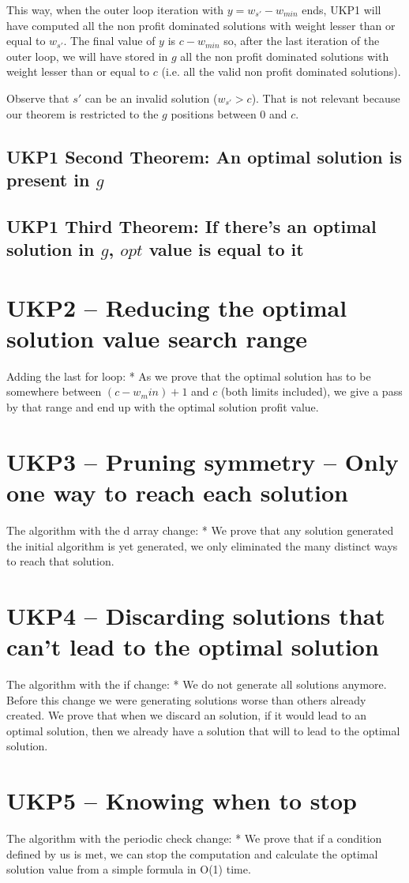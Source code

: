 \documentclass[12pt]{article}
\begin{document}
This way, when the outer loop iteration with \(y = w_{s'}-w_{min}\) ends, UKP1 will have computed all the non profit dominated solutions with weight lesser than or equal to \(w_{s'}\). The final value of \(y\) is \(c-w_{min}\) so, after the last iteration of the outer loop, we will have stored in \(g\) all the non profit dominated solutions with weight lesser than or equal to \(c\) (i.e. all the valid non profit dominated solutions).

Observe that \(s'\) can be an invalid solution (\(w_{s'} > c\)). That is not relevant because our theorem is restricted to the \(g\) positions between \(0\) and \(c\).

\subsection{UKP1 Second Theorem: An optimal solution is present in \(g\)}

\subsection{UKP1 Third Theorem: If there's an optimal solution in \(g\), \(opt\) value is equal to it}

\section{UKP2 -- Reducing the optimal solution value search range}
Adding the last for loop:
	* As we prove that the optimal solution has to be somewhere between \((c-w_min)+1\) and \(c\) (both limits included), we give a pass by that range and end up with the optimal solution profit value.

\section{UKP3 -- Pruning symmetry -- Only one way to reach each solution}
The algorithm with the d array change:
	* We prove that any solution generated the initial algorithm is yet generated, we only eliminated the many distinct ways to reach that solution.

\section{UKP4 -- Discarding solutions that can't lead to the optimal solution}
The algorithm with the if change:
	* We do not generate all solutions anymore. Before this change we were generating solutions worse than others already created. We prove that when we discard an solution, if it would lead to an optimal solution, then we already have a solution that will to lead to the optimal solution.

\section{UKP5 -- Knowing when to stop}
The algorithm with the periodic check change:
	* We prove that if a condition defined by us is met, we can stop the computation and calculate the optimal solution value from a simple formula in O(1) time.
\end{document}
